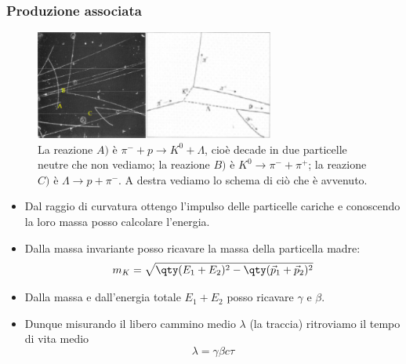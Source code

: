 \subsubsection{Produzione associata}
\begin{figure}[H]
    \centering
    \includegraphics[width=0.7\textwidth]{immagini/fig_bubb_chamb_strange.png}
    \caption{La reazione $A)$ è $\pi^-+p\to K^0+\Lambda$, cioè decade in due particelle neutre che non vediamo; la reazione $B)$ è $K^0\to\pi^-+\pi^+$; la reazione $C)$ è $\Lambda\to p+\pi^-$. A destra vediamo lo schema di ciò che è avvenuto.}
\end{figure}
\begin{itemize}
\item Dal raggio di curvatura ottengo l'impulso delle particelle cariche e conoscendo la loro massa posso calcolare l'energia.
\item Dalla massa invariante posso ricavare la massa della particella madre:
\begin{equation*}
m_K=\sqrt{\qty(E_1+E_2)^2-\qty(\vec p_1+\vec p_2)^2}
\end{equation*}
\item Dalla massa e dall'energia totale $E_1+E_2$ posso ricavare $\gamma$ e $\beta$. 
\item Dunque misurando il libero cammino medio $\lambda$ (la traccia) ritroviamo il tempo di vita medio
\begin{equation*}
\lambda=\gamma\beta c\tau
\end{equation*}
\end{itemize}
